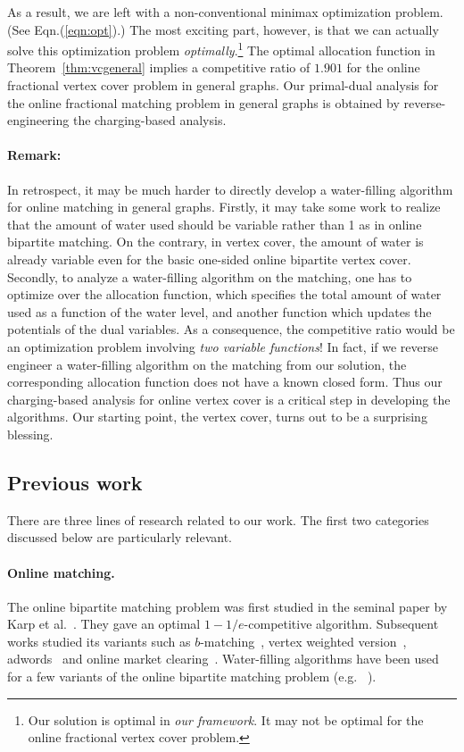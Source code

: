 \documentclass{article}
\begin{document}
As a result, we are left with a non-conventional minimax optimization problem. (See Eqn.(\ref{eqn:opt}).) The most exciting part, however, is that we can actually solve this optimization problem {\em optimally}.\footnote{Our solution is optimal in {\em our framework}. It may not be optimal for the online fractional vertex cover problem. } The optimal allocation function in Theorem~\ref{thm:vcgeneral} implies a competitive ratio of $1.901$ for the online fractional vertex cover problem in general graphs.
Our primal-dual analysis for the online fractional matching problem in general graphs is obtained by reverse-engineering the charging-based analysis.

\paragraph{Remark:} In retrospect, it may be much harder to directly develop a water-filling algorithm for online matching in general graphs. 
Firstly, it may take some work to realize that the amount of water used should be variable rather than 1 as in online bipartite matching. On the contrary, in vertex cover, the amount of water is already variable even for the basic one-sided online bipartite vertex cover. Secondly, to analyze a water-filling algorithm on the matching, one has to optimize over the allocation function, which specifies the total amount of water used as a function of the water level, and another function which updates the potentials of the dual variables. As a consequence, the competitive ratio would be an optimization problem involving {\em two variable functions}! In fact, if we reverse engineer a water-filling algorithm on the matching from our solution, the corresponding allocation function does not have a known closed form.
Thus our charging-based analysis for online vertex cover is a critical step in developing the algorithms. Our starting point, the vertex cover, turns out to be a surprising blessing.

\subsection{Previous work}
There are three lines of research related to our work. The first two categories discussed below are particularly relevant.

\paragraph{Online matching.}
The online bipartite matching problem was first studied in the seminal paper by Karp et al.~\cite{Karp1990}. They gave an optimal $1-1/e$-competitive algorithm. Subsequent works studied its variants such as $b$-matching~\cite{kalyanasundaram2000optimal}, vertex weighted version~\cite{Aggarwal2011,devanurrandomized}, adwords~\cite{Buchbinder2007,DevenurH09,Mehta2007,devanurrandomized, devanur2012online,goel2008online,Aggarwal2011} and online market clearing~\cite{Blum2006}. Water-filling algorithms have been used for a few variants of the online bipartite matching problem (e.g. ~\cite{kalyanasundaram2000optimal,Buchbinder2007}).
\end{document}
